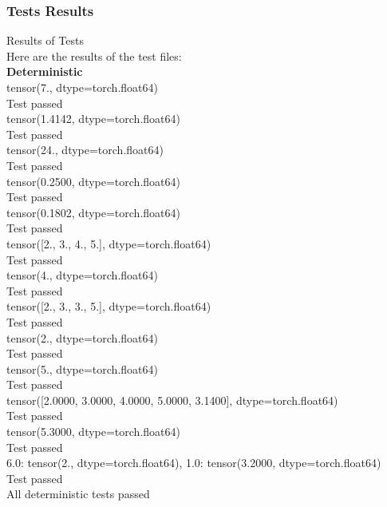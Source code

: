 \documentclass{article}
\def\blu#1{{\color{blu}#1}}
\begin{document}
\subsubsection{Tests Results}
\blu{Results of Tests}\\
Here are the results of the test files:\\
\textbf{Deterministic}\\
tensor(7., dtype=torch.float64)\\
Test passed\\
tensor(1.4142, dtype=torch.float64)\\
Test passed\\
tensor(24., dtype=torch.float64)\\
Test passed\\
tensor(0.2500, dtype=torch.float64)\\
Test passed\\
tensor(0.1802, dtype=torch.float64)\\
Test passed\\
tensor([2., 3., 4., 5.], dtype=torch.float64)\\
Test passed\\
tensor(4., dtype=torch.float64)\\
Test passed\\
tensor([2., 3., 3., 5.], dtype=torch.float64)\\
Test passed\\
tensor(2., dtype=torch.float64)\\
Test passed\\
tensor(5., dtype=torch.float64)\\
Test passed\\
tensor([2.0000, 3.0000, 4.0000, 5.0000, 3.1400], dtype=torch.float64)\\
Test passed\\
tensor(5.3000, dtype=torch.float64)\\
Test passed\\
{6.0: tensor(2., dtype=torch.float64), 1.0: tensor(3.2000, dtype=torch.float64)}\\
Test passed\\
All deterministic tests passed\\
\pagebreak
\end{document}
